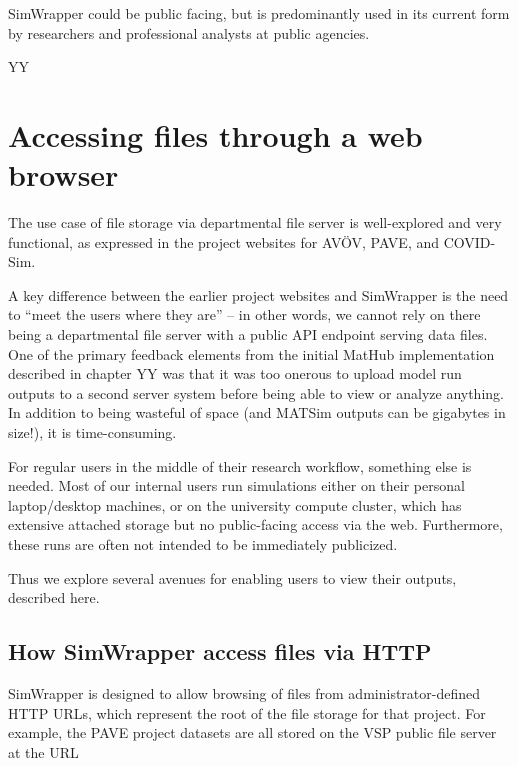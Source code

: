\documentclass[3p,times,procedia]{elsarticle}
\begin{document}
SimWrapper could be public facing, but is predominantly used in its
current form by researchers and professional analysts at public
agencies.

YY

\section{Accessing files through a web browser}

The use case of file storage via departmental file server is
well-explored and very functional, as expressed in the project websites
for AVÖV, PAVE, and COVID-Sim.

A key difference between the earlier project websites and SimWrapper is
the need to ``meet the users where they are'' -- in other words, we
cannot rely on there being a departmental file server with a public API
endpoint serving data files. One of the primary feedback elements from
the initial MatHub implementation described in chapter YY was that it
was too onerous to upload model run outputs to a second server system
before being able to view or analyze anything. In addition to being
wasteful of space (and MATSim outputs can be gigabytes in size!), it is
time-consuming.

For regular users in the middle of their research workflow, something
else is needed. Most of our internal users run simulations either on
their personal laptop/desktop machines, or on the university compute
cluster, which has extensive attached storage but no public-facing
access via the web. Furthermore, these runs are often not intended to be
immediately publicized.

Thus we explore several avenues for enabling users to view their
outputs, described here.


\subsection{How SimWrapper access files via HTTP}

SimWrapper is designed to allow browsing of files from
administrator-defined HTTP URLs, which represent the root of the file
storage for that project. For example, the PAVE project datasets are all
stored on the VSP public file server at the URL
\end{document}
